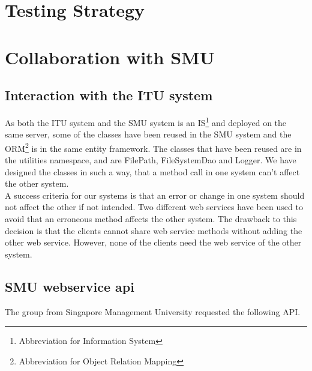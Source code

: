 \documentclass[a4paper,11pt,report]{article}
\begin{document}
\section{Testing Strategy}

\section{Collaboration with SMU}

\subsection{Interaction with the ITU system}
As both the ITU system and the SMU system is an IS\footnote[2]{Abbreviation for Information System} and deployed on the same server, some of the classes have been reused in the SMU system and the ORM\footnote[3]{Abbreviation for Object Relation Mapping} is in the same entity framework.
The classes that have been reused are in the utilities namespace, and are FilePath, FileSystemDao and Logger. We have designed the classes in such a way, that a method call in one system can't affect the other system. \\
A success criteria for our systems is that an error or change in one system should not affect the other if not intended. Two different web services have been used to avoid that an erroneous method affects the other system.
The drawback to this decision is that the clients cannot share web service methods without adding the other web service. However, none of the clients need the web service of the other system. 

\subsection{SMU webservice api}
The group from Singapore Management University requested the following API.
\end{document}
